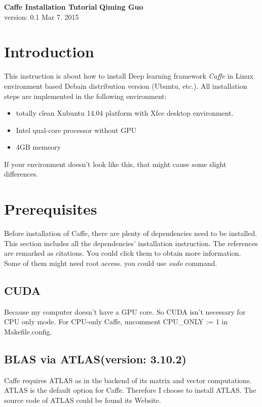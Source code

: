 \documentclass[a4paper, 11pt]{article}
\begin{document}
\noindent
\large\textbf{Caffe Installation Tutorial} \hfill \textbf{Qiming Guo} \\
\normalsize version: 0.1 \hfill Mar 7. 2015 \\

\section*{Introduction}
This instruction is about how to install Deep learning framework \emph{Caffe} in Linux environment based Debain distribution version (Ubuntu, etc.).
All installation steps are implemented in the following environment:

\begin{itemize}
\item totally clean Xubuntu 14.04 platform with Xfce desktop environment.
\item Intel qual-core processor without GPU
\item 4GB memeory
\end{itemize}

If your environment doesn't look like this, that might cause some slight differences.


\section*{Prerequisites}
Before installation of Caffe, there are plenty of dependencies need to be installed.\cite{caffe1} This section includes all the dependencies' installation instruction. The references are remarked as citations. You could click them to obtain more information. Some of them might need root access. you could use \emph{sudo} command.

\subsection{CUDA}

Because my computer doesn't have a GPU core. So CUDA isn't necessary for CPU only mode. For CPU-only Caffe, uncomment CPU\_ONLY := 1 in Makefile.config.\cite{caffe1}

\subsection{BLAS via ATLAS(version: 3.10.2)}

Caffe requires ATLAS as in the backend of its matrix and vector computations. ATLAS is the default option for Caffe. Therefore I choose to install ATLAS. The source code of ATLAS could be found its Website.\cite{atlas1}
\end{document}
